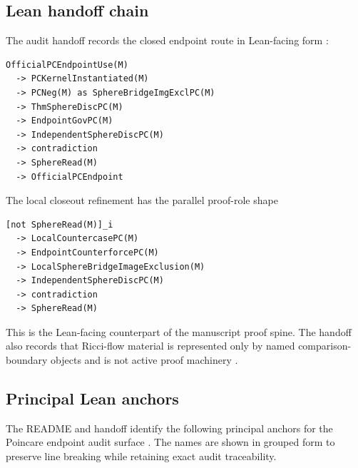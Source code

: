 \documentclass[11pt]{article}
\begin{document}
\subsection*{Lean handoff chain}
{}

The audit handoff records the closed endpoint route in Lean-facing form \cite{PoincareLeanAuditHandoff2026}:
\begin{verbatim}
OfficialPCEndpointUse(M)
  -> PCKernelInstantiated(M)
  -> PCNeg(M) as SphereBridgeImgExclPC(M)
  -> ThmSphereDiscPC(M)
  -> EndpointGovPC(M)
  -> IndependentSphereDiscPC(M)
  -> contradiction
  -> SphereRead(M)
  -> OfficialPCEndpoint
\end{verbatim}
The local closeout refinement has the parallel proof-role shape
\begin{verbatim}
[not SphereRead(M)]_i
  -> LocalCountercasePC(M)
  -> EndpointCounterforcePC(M)
  -> LocalSphereBridgeImageExclusion(M)
  -> IndependentSphereDiscPC(M)
  -> contradiction
  -> SphereRead(M)
\end{verbatim}
This is the Lean-facing counterpart of the manuscript proof spine. The handoff also records that Ricci-flow material is represented only by named comparison-boundary objects and is not active proof machinery \cite{PoincareLeanAuditHandoff2026}.

\subsection*{Principal Lean anchors}
{}

The README and handoff identify the following principal anchors for the Poincare endpoint audit surface \cite{PoincareLeanAuditGithub2026,PoincareLeanAuditHandoff2026}. The names are shown in grouped form to preserve line breaking while retaining exact audit traceability.
\end{document}

